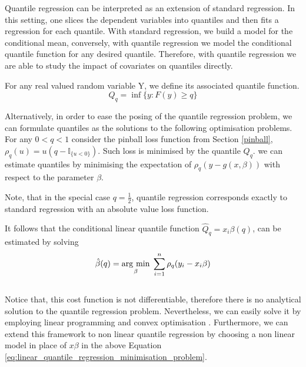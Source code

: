 Quantile regression can be interpreted as an extension of standard regression. In this setting, one slices the dependent variables into quantiles and then fits a regression for each quantile. With standard regression, we build a model for the conditional mean, conversely, with quantile regression we model the conditional quantile function for any desired quantile. 
Therefore, with quantile regression we are able to study the impact of covariates on quantiles directly.
\begin{definition}
    For any real valued random variable Y, we define its associated quantile function.
    \begin{equation}
        Q_q=\inf\{y:F(y)\geq q\}
    \end{equation}
\end{definition}
Alternatively, in order  to ease the posing of the quantile regression problem, we can formulate quantiles as the solutions to the following optimisation problems.
For any $0<q<1$ consider the pinball loss function from Section \ref{pinball}, $\rho_q(u)=u(q-\mathbb{I}_{\{u<0\}})$. 
Such loss is minimised by the quantile $Q_q$.
 we can estimate quantiles by minimising the expectation of $\rho_q(y-g(x,\beta))$ with respect to the parameter $\beta$.

Note, that in the special case $q=\frac{1}{2}$,  quantile regression corresponds exactly to standard regression with an absolute value loss function.

It follows that the conditional linear quantile function $\hat{Q}_q=x_i\beta(q)$, can be estimated by solving
\begin{equation}\label{eq:linear_quantile_regression_minimisation_problem}
    \hat{\beta}(q)=\underset{\beta}{\operatorname{arg}\,\operatorname{min}}\;\sum\limits_{i=1}^n \rho_q   (y_i-x_i \beta)
\end{equation}
\\
Notice that, this cost function is not differentiable, therefore there is no analytical solution to the quantile regression problem. Nevertheless, we can easily solve it by employing linear programming and convex optimisation \cite{boyd2004convex}.
Furthermore, we can extend this framework to non linear quantile regression by choosing a non linear model in place of $x\beta$ in the above Equation \ref{eq:linear_quantile_regression_minimisation_problem}.
